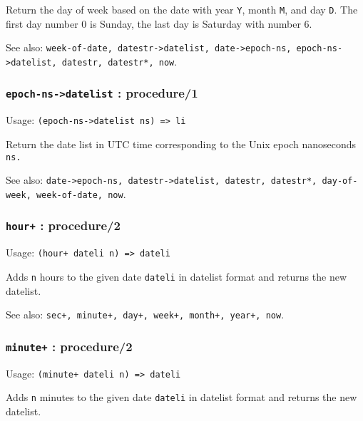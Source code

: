 \documentclass[
]{article}
\newcommand{\passthrough}[1]{#1}
\begin{document}
Return the day of week based on the date with year
\passthrough{\lstinline!Y!}, month \passthrough{\lstinline!M!}, and day
\passthrough{\lstinline!D!}. The first day number 0 is Sunday, the last
day is Saturday with number 6.

See also:
\passthrough{\lstinline!week-of-date, datestr->datelist, date->epoch-ns, epoch-ns->datelist, datestr, datestr*, now!}.

\hypertarget{epoch-ns-datelist-procedure1}{%
\subsubsection{\texorpdfstring{\texttt{epoch-ns-\textgreater{}datelist}
:
procedure/1}{epoch-ns-\textgreater datelist : procedure/1}}\label{epoch-ns-datelist-procedure1}}

Usage: \passthrough{\lstinline!(epoch-ns->datelist ns) => li!}

Return the date list in UTC time corresponding to the Unix epoch
nanoseconds \passthrough{\lstinline!ns.!}

See also:
\passthrough{\lstinline!date->epoch-ns, datestr->datelist, datestr, datestr*, day-of-week, week-of-date, now!}.

\hypertarget{hour-procedure2}{%
\subsubsection{\texorpdfstring{\texttt{hour+} :
procedure/2}{hour+ : procedure/2}}\label{hour-procedure2}}

Usage: \passthrough{\lstinline!(hour+ dateli n) => dateli!}

Adds \passthrough{\lstinline!n!} hours to the given date
\passthrough{\lstinline!dateli!} in datelist format and returns the new
datelist.

See also:
\passthrough{\lstinline!sec+, minute+, day+, week+, month+, year+, now!}.

\hypertarget{minute-procedure2}{%
\subsubsection{\texorpdfstring{\texttt{minute+} :
procedure/2}{minute+ : procedure/2}}\label{minute-procedure2}}

Usage: \passthrough{\lstinline!(minute+ dateli n) => dateli!}

Adds \passthrough{\lstinline!n!} minutes to the given date
\passthrough{\lstinline!dateli!} in datelist format and returns the new
datelist.
\end{document}

